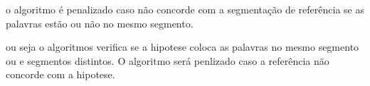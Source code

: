 








o algoritmo é penalizado caso não concorde com a segmentação de referência se as palavras estão ou não no mesmo segmento. 



ou seja o algoritmos verifica se a hipotese coloca as palavras no mesmo segmento ou e segmentos distintos. O algoritmo será penlizado caso a referência não concorde com a hipotese.





